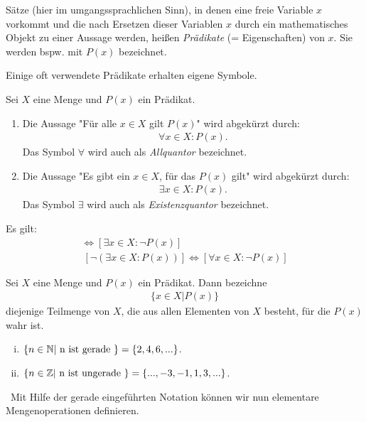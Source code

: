 \begin{mydef}
    Sätze (hier im umgangssprachlichen Sinn), in denen eine freie Variable $x$ vorkommt und die nach Ersetzen dieser Variablen $x$ durch ein mathematisches Objekt zu einer Aussage werden, 
    heißen \textit{Prädikate} (= Eigenschaften) von $x$. Sie werden bspw. mit $P(x)$ bezeichnet.
\end{mydef}

Einige oft verwendete Prädikate erhalten eigene Symbole. 

\begin{mydef}
    Sei $X$ eine Menge und $P(x)$ ein Prädikat.
    \begin{enumerate}
        \item 
        Die Aussage "Für alle $x \in X$ gilt $P(x)$" wird abgekürzt durch: 
        \begin{align*}
            \forall x \in X : P(x).
        \end{align*}
        Das Symbol $\forall$ wird auch als \textit{Allquantor} bezeichnet. 
        \item 
        Die Aussage "Es gibt ein $x \in X$, für das $P(x)$ gilt" wird abgekürzt durch: 
        \begin{align*}
            \exists x \in X : P(x).
        \end{align*}
        Das Symbol $\exists$ wird auch als \textit{Existenzquantor} bezeichnet. 
    \end{enumerate}
\end{mydef}

\begin{remark}
    Es gilt: 
    \begin{align*}
        [ \neg (\forall x \in X: P(x))] \iff [\exists x \in X: \neg P(x)] \\\
        [ \neg (\exists x \in X: P(x))] \iff [\forall x \in X: \neg P(x)]
    \end{align*}
\end{remark}

\begin{mydef}
    Sei $X$ eine Menge und $P(x)$ ein Prädikat. Dann bezeichne 
    \begin{align*}
        \{ x \in X | P(x) \}
    \end{align*}
    diejenige Teilmenge von $X$, die aus allen Elementen von $X$ besteht, für die $P(x)$ wahr ist. 
\end{mydef}

\begin{example}
    \begin{enumerate}[(i)]
        \item 
        $\{n \in \mathbb{N} | \text{ n ist gerade } \} = \{2,4,6,...\}$. 
        \item 
        $\{n \in \mathbb{Z} | \text{ n ist ungerade } \} = \{...,-3,-1,1,3,...\}$. 
        
    \end{enumerate}    
\end{example}\ 
Mit Hilfe der gerade eingeführten Notation können wir nun elementare Mengenoperationen definieren. 

